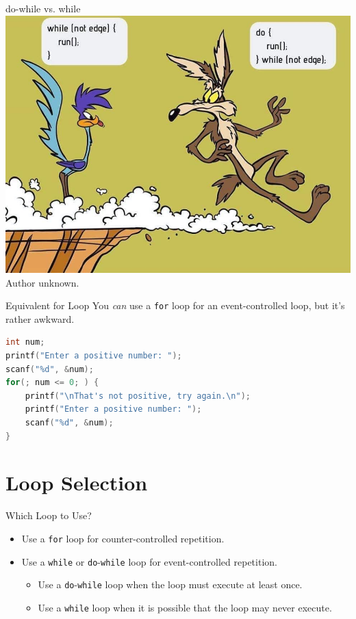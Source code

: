 \documentclass[graphics]{beamer}
\begin{document}
\begin{frame}{do-while vs. while}
    \centering
    \includegraphics[scale=0.3]{L11_MoreLoops/do_while.png} \\
    \footnotesize Author unknown.
\end{frame}

\begin{frame}[fragile]{Equivalent for Loop}
    You \textit{can} use a \texttt{for} loop for an event-controlled loop, but it's rather awkward.
    \begin{lstlisting}[language=C,basicstyle=\footnotesize,keywordstyle=\color{blue},commentstyle=\color{green},showstringspaces=false,stringstyle=\color{red}]
int num;
printf("Enter a positive number: ");
scanf("%d", &num);
for(; num <= 0; ) {
    printf("\nThat's not positive, try again.\n");
    printf("Enter a positive number: ");
    scanf("%d", &num);
}
    \end{lstlisting}
\end{frame}

\section{Loop Selection}
\begin{frame}{Which Loop to Use?}
    \begin{itemize}
        \item Use a \texttt{for} loop for counter-controlled repetition.
        \item Use a \texttt{while} or \texttt{do}-\texttt{while} loop for event-controlled repetition.
        \begin{itemize}
            \item Use a \texttt{do}-\texttt{while} loop when the loop must execute at least once.
            \item Use a \texttt{while} loop when it is possible that the loop may never execute.
        \end{itemize}
    \end{itemize}
\end{frame}
\end{document}
